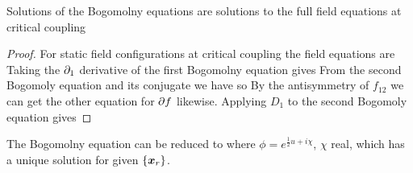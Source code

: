 \documentclass{article}
\begin{document}
\begin{prop}
Solutions of the Bogomolny equations are solutions to the full field equations at critical coupling
\end{prop}
\begin{proof}
For static field configurations at critical coupling the field equations are 
Taking the $\partial_1$ derivative of the first Bogomolny equation gives 
From the second Bogomoly equation and its conjugate we have 
so 
By the antisymmetry of $f_{12}$ we can get the other equation for $\partial f$ likewise. 
Applying $D_1$ to the second Bogomoly equation gives 
\end{proof}

\begin{theorem}
The Bogomolny equation can be reduced to 
where $\phi = e^{\frac{1}{2}u + i \chi}$, $\chi$ real, which has a unique solution for given $\left\{ \bm{x}_r \right\}$. 
\end{theorem}
\end{document}

